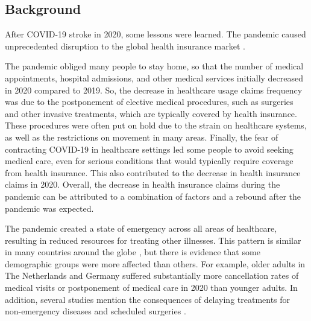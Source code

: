 \documentclass[]{risa}
\begin{document}
\subsection{Background}
After COVID-19 stroke in 2020, some lessons were learned. The pandemic caused unprecedented disruption to the global health insurance market \cite{przybytniowski2022risk, szczygielski2022impact}.

The pandemic obliged many people to stay home, so that the number of medical appointments, hospital admissions, and other medical services initially decreased in 2020 compared to 2019. So, the decrease in healthcare usage claims frequency was due to the postponement of elective medical procedures, such as surgeries and other invasive treatments, which are typically covered by health insurance. These procedures were often put on hold due to the strain on healthcare systems, as well as the restrictions on movement in many areas. Finally, the fear of contracting COVID-19 in healthcare settings led some people to avoid seeking medical care, even for serious conditions that would typically require coverage from health insurance. This also contributed to the decrease in health insurance claims in 2020. Overall, the decrease in health insurance claims during the pandemic can be attributed to a combination of factors\cite{plott2020unexpected} and a rebound after the pandemic was expected.

The pandemic created a state of emergency across all areas of healthcare, resulting in reduced resources for treating other illnesses. This pattern is similar in many countries around the globe \cite{xu2021impact, mogharab2022global}, but there is evidence that some demographic groups were more affected than others. For example, older adults in The Netherlands \cite{mizee2022delay}  and Germany \cite{michalowsky2021effect} suffered substantially more cancellation rates of medical visits or postponement of medical care in 2020 than younger adults. In addition, several studies mention the consequences of delaying treatments for non-emergency diseases  \cite{kim2022impactb, kotrych2022delay, di2022impact}  and scheduled surgeries \cite{ricciardiello2021impact}.
\end{document}
